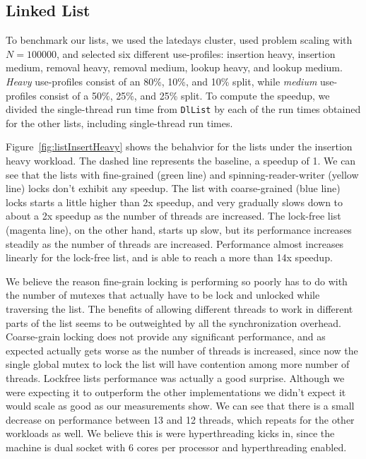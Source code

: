 \documentclass[11pt]{article}
\begin{document}
\subsection{Linked List}
To benchmark our lists, we used the latedays cluster, used problem scaling with
$N=100000$, and selected six different use-profiles: insertion heavy, insertion
medium, removal heavy, removal medium, lookup heavy, and lookup medium. {\it
Heavy} use-profiles consist of an 80\%, 10\%, and 10\% split, while {\it
medium} use-profiles consist of a 50\%, 25\%, and 25\% split. To compute the
speedup, we divided the single-thread run time from {\tt DlList} by each of the
run times obtained for the other lists, including single-thread run times.

Figure~\ref{fig:listInsertHeavy} shows the behahvior for the lists under the
insertion heavy workload. The dashed line represents the baseline, a speedup of
1. We can see that the lists with fine-grained (green line) and
spinning-reader-writer (yellow line) locks don't exhibit any speedup. The list
with coarse-grained (blue line) locks starts a little higher than 2x speedup,
and very gradually slows down to about a 2x speedup as the number of threads are
increased. The lock-free list (magenta line), on the other hand, starts up slow,
but its performance increases steadily as the number of threads are increased.
Performance almost increases linearly for the lock-free list, and is able to
reach a more than 14x speedup.

We believe the reason fine-grain locking is performing so poorly has to do with 
the number of mutexes that actually have to be lock and unlocked while traversing
the list. The benefits of allowing different threads to work in different parts
of the list seems to be outweighted by all the synchronization overhead.
Coarse-grain locking does not provide any significant performance, and as expected
actually gets worse as the number of threads is increased, since now the single
global mutex to lock the list will have contention among more number of threads.
Lockfree lists performance was actually a good surprise. Although we were expecting
it to outperform the other implementations we didn't expect it would scale as good
as our measurements show. We can see that there is a small decrease on performance
between 13 and 12 threads, which repeats for the other workloads as well. We believe
this is were hyperthreading kicks in, since the machine is dual socket with 6 cores
per processor and hyperthreading enabled.
\end{document}
